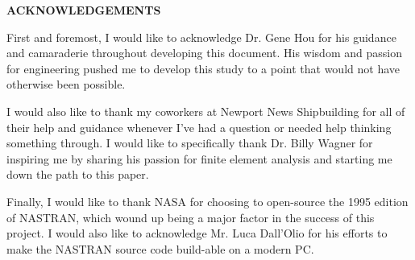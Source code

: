 
{\LARGE\center
  \textbf{\uppercase{Acknowledgements}}\par
}
\vspace{2.5cm}

First and foremost, I would like to acknowledge Dr. Gene Hou for his guidance and camaraderie throughout developing this document. His wisdom and passion for engineering pushed me to develop this study to a point that would not have otherwise been possible. 

I would also like to thank my coworkers at Newport News Shipbuilding for all of their help and guidance whenever I've had a question or needed help thinking something through. I would like to specifically thank Dr. Billy Wagner for inspiring me by sharing his passion for finite element analysis and starting me down the path to this paper. 

Finally, I would like to thank NASA for choosing to open-source the 1995 edition of NASTRAN, which wound up being a major factor in the success of this project. I would also like to acknowledge Mr. Luca Dall'Olio for his efforts to make the NASTRAN source code build-able on a modern PC. 


